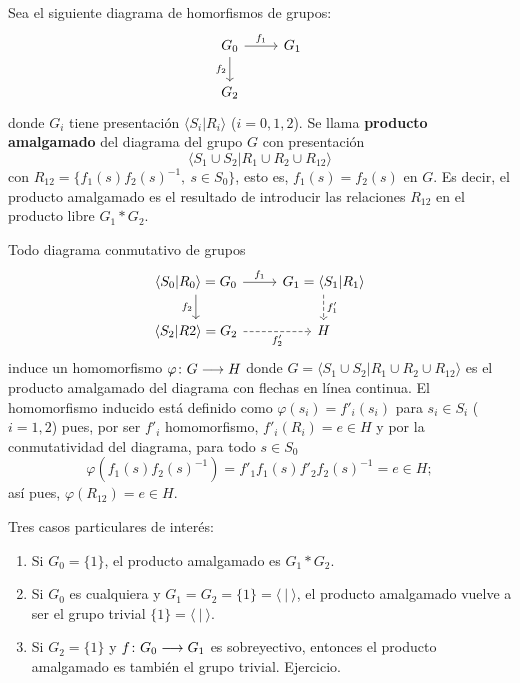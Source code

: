 \documentclass[GTSResumen.tex]{subfiles}
\begin{document}
\begin{defi}
Sea el siguiente diagrama de homorfismos de grupos:
\[
\begin{tikzcd}
G_0 \ar[r, "f_1"]\arrow[d,"f_2 "'] & G_1\\
G_2
\end{tikzcd}
\]
donde $G_i$ tiene presentación $\langle S_i|R_i\rangle$ ($i=0,1,2$). Se llama \textbf{producto amalgamado} del diagrama del grupo $G$ con presentación
\[
\langle S_1\cup S_2 | R_1\cup R_2\cup R_{12}\rangle
\]
con $R_{12}=\{f^{}_1(s)f^{}_2(s)^{-1},\ s\in S_0\}$, esto es, $f_1(s)=f_2(s)$ en $G$. Es decir, el producto amalgamado es el resultado de introducir las relaciones $R_{12}$ en el producto libre $G_1*G_2$.
\end{defi}

\begin{nota}[Importante] Todo diagrama conmutativo de grupos
\[
\begin{tikzcd}
\langle S_0|R_0\rangle =G_0 \ar[r, "f_1"]\arrow[d,"f_2 "'] & G_1=\langle S_1|R_1\rangle\ar[d,dashed,"f'_1"]\\
\langle S_2|R2 \rangle =G_2\ar[r, dashed, "f'_2"'] & H
\end{tikzcd}
\]
induce un homomorfismo $\varphi\colon{G}\longrightarrow{H}$ donde $G=\langle S_1\cup S_2 | R_1\cup R_2\cup R_{12}\rangle$ es el producto amalgamado del diagrama con flechas en línea continua. El homomorfismo inducido está definido como $\varphi(s_i)=f'_i(s_i)$ para $s_i\in S_i$ ($i=1,2$) pues, por ser $f'_i$ homomorfismo, $f'_i(R_i)=e\in H$ y por la conmutatividad del diagrama, para todo $s\in S_0$
\[
\varphi(f_1(s)f_2(s)^{-1})=f'_1f_1^{}(s)f'_2f_2^{}(s)^{-1}=e\in H;
\]
así pues, $\varphi(R_{12})=e\in H$.
\end{nota}

\begin{ej} Tres casos particulares de interés:
\begin{enumerate}
\item Si $G_0=\{1\}$, el producto amalgamado es $G_1*G_2$.
\item Si $G_0$ es cualquiera y $G_1=G_2=\{1\}=\langle\ |\ \rangle$, el producto amalgamado vuelve a ser el grupo trivial $\{1\}=\langle\ |\ \rangle$.
\item Si $G_2=\{1\}$ y $f\colon{G_0}\longrightarrow{G_1}$ es sobreyectivo, entonces el producto amalgamado es también el grupo trivial. Ejercicio.
\end{enumerate}

\end{ej}
\end{document}
